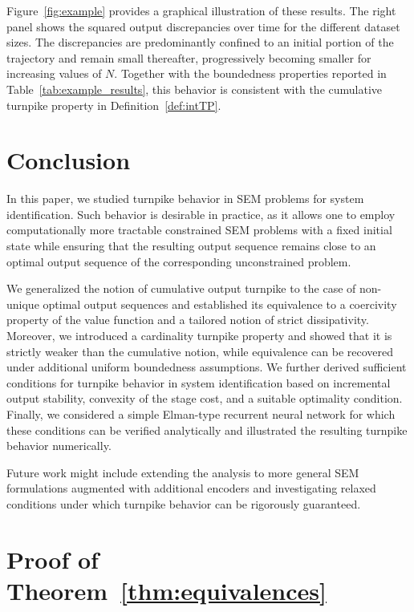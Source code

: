 \documentclass[a4paper,fleqn]{cas-dc}
\begin{document}
Figure~\ref{fig:example} provides a graphical illustration of these results.
The right panel shows the squared output discrepancies over time for the different dataset sizes.
The discrepancies are predominantly confined to an initial portion of the trajectory and remain small thereafter, progressively becoming smaller for increasing values of $N$. Together with the boundedness properties reported in Table~\ref{tab:example_results}, this behavior is consistent with the cumulative turnpike property in Definition~\ref{def:intTP}.


\section{Conclusion}
In this paper, we studied turnpike behavior in SEM problems for system identification.
Such behavior is desirable in practice, as it allows one to employ computationally more tractable constrained SEM problems with a fixed initial state while ensuring that the resulting output sequence remains close to an optimal output sequence of the corresponding unconstrained problem.

We generalized the notion of cumulative output turnpike to the case of non-unique optimal output sequences and established its equivalence to a coercivity property of the value function and a tailored notion of strict dissipativity. Moreover, we introduced a cardinality turnpike property and showed that it is strictly weaker than the cumulative notion, while equivalence can be recovered under additional uniform boundedness assumptions.
We further derived sufficient conditions for turnpike behavior in system identification based on incremental output stability, convexity of the stage cost, and a suitable optimality condition.
Finally, we considered a simple Elman-type recurrent neural network for which these conditions can be verified analytically and illustrated the resulting turnpike behavior numerically.

{Future work might include extending the analysis to more general SEM formulations augmented with additional encoders and investigating relaxed conditions under which turnpike behavior can be rigorously guaranteed.}

\appendix

\section{Proof of Theorem~\ref{thm:equivalences}}
\label{sec:thm_equivalences}
\end{document}

